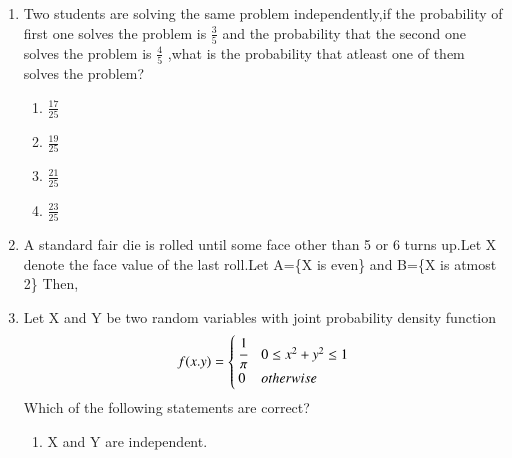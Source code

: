 \renewcommand{\theequation}{\theenumi}
\renewcommand{\thefigure}{\theenumi}
\begin{enumerate}[label=\thesection.\arabic*.,ref=\thesection.\theenumi]

\item Two students are solving the same problem independently,if the probability of first one solves the problem is $\frac{3}{5}$ and the probability that the second one solves the problem is $\frac{4}{5}$ ,what is the probability that atleast one of them solves the problem?
\begin{enumerate}

\item $ \frac{17}{25}$\\
\item $\frac{19}{25}$\\
\item $ \frac{21}{25}$\\
\item $\frac{23}{25}$

\end{enumerate}
%
\solution

%
\item A standard fair die is rolled until some face other than 5 or 6 turns up.Let X denote the face value of the last roll.Let A=\{X is even\} and B=\{X is atmost 2\}
Then,
\begin{enumerate}
\end{enumerate}
%
\solution

%
\item Let X and Y be two random variables with joint probability density function
\begin{align*}
    f(x.y)=
    \begin{cases}
    \cfrac{1}{\pi} & 0\le x^2 + y^2 \le 1\\
    0 & otherwise
    \end{cases}
\end{align*}
Which of the following statements are correct?
\begin{enumerate}
    \item
    X and Y are independent.
    

\end{enumerate}
\end{enumerate}
